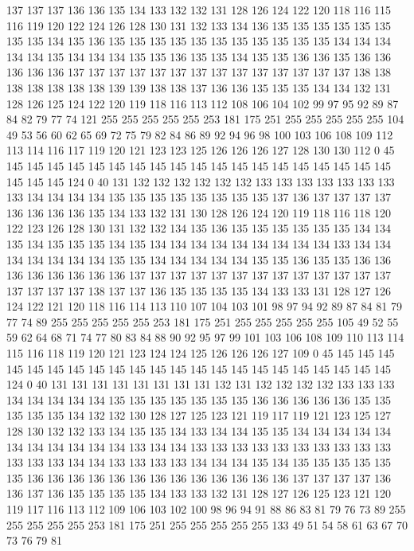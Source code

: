 137 137 137 136 136 135 134 133 132 132 131 128 126 124 122 120 118 116 115 116
119 120 122 124 126 128 130 131 132 133 134 136 135 135 135 135 135 135 135 135
134 135 136 135 135 135 135 135 135 135 135 135 135 135 134 134 134 134 134 135
134 134 134 135 135 136 135 135 134 135 135 136 136 135 136 136 136 136 136 137
137 137 137 137 137 137 137 137 137 137 137 137 137 138 138 138 138 138 138 138
139 139 138 138 137 136 136 135 135 135 134 134 132 131 128 126 125 124 122 120
119 118 116 113 112 108 106 104 102 99 97 95 92 89 87 84 82 79 77 74
121 255 255 255 255 255 253 181 175 251 255 255 255 255 255 104 49 53 56 60
62 65 69 72 75 79 82 84 86 89 92 94 96 98 100 103 106 108 109 112
113 114 116 117 119 120 121 123 123 125 126 126 126 127 128 130 130 112 0 45
145 145 145 145 145 145 145 145 145 145 145 145 145 145 145 145 145 145 145 145
145 145 124 0 40 131 132 132 132 132 132 132 133 133 133 133 133 133 133 133
134 134 134 134 135 135 135 135 135 135 135 135 137 136 137 137 137 137 136 136
136 136 135 134 133 132 131 130 128 126 124 120 119 118 116 118 120 122 123 126
128 130 131 132 132 134 135 136 135 135 135 135 135 135 134 134 135 134 135 135
135 134 135 134 134 134 134 134 134 134 134 134 133 134 134 134 134 134 134 134
135 135 134 134 134 134 134 135 135 136 135 135 136 136 136 136 136 136 136 136
137 137 137 137 137 137 137 137 137 137 137 137 137 137 137 137 137 138 137 137
136 135 135 135 135 134 133 133 131 128 127 126 124 122 121 120 118 116 114 113
110 107 104 103 101 98 97 94 92 89 87 84 81 79 77 74 89 255 255 255
255 255 253 181 175 251 255 255 255 255 255 105 49 52 55 59 62 64 68 71
74 77 80 83 84 88 90 92 95 97 99 101 103 106 108 109 110 113 114 115
116 118 119 120 121 123 124 124 125 126 126 126 127 109 0 45 145 145 145 145
145 145 145 145 145 145 145 145 145 145 145 145 145 145 145 145 145 145 124 0
40 131 131 131 131 131 131 131 131 132 131 132 132 132 132 133 133 133 134 134
134 134 134 135 135 135 135 135 135 135 136 136 136 136 136 135 135 135 135 135
134 132 132 130 128 127 125 123 121 119 117 119 121 123 125 127 128 130 132 132
133 134 135 135 134 133 134 134 135 135 134 134 134 134 134 134 134 134 134 134
134 133 134 134 133 133 133 133 133 133 133 133 133 133 133 133 133 134 134 133
133 133 133 134 134 134 135 134 135 135 135 135 135 135 136 136 136 136 136 136
136 136 136 136 136 136 136 137 137 137 137 136 136 137 136 135 135 135 135 134
133 133 132 131 128 127 126 125 123 121 120 119 117 116 113 112 109 106 103 102
100 98 96 94 91 88 86 83 81 79 76 73 89 255 255 255 255 255 253 181
175 251 255 255 255 255 255 133 49 51 54 58 61 63 67 70 73 76 79 81
